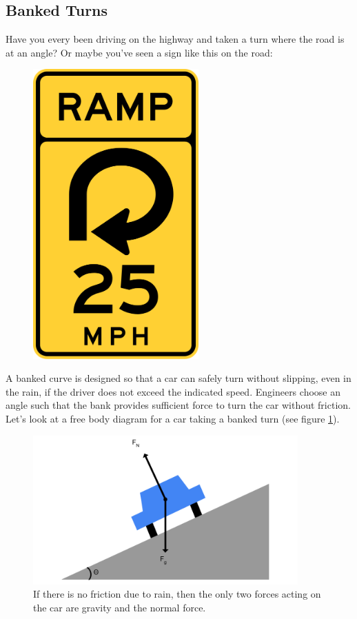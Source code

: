 \subsection{Banked Turns}
Have you every been driving on the highway and taken a turn where the road is at an angle? Or maybe you've seen a sign like this on the road:

\begin{figure} %
\includegraphics[width=2.5in]{traffic.png}
\end{figure}

A banked curve is designed so that a car can safely turn without slipping, even in the rain, if the driver does not exceed the indicated speed. Engineers choose an angle such that the bank provides sufficient force to turn the car without friction. Let's look at a free body diagram for a car taking a banked turn (see figure \ref{fig:banked}). 
\vspace{4cm} %
\begin{figure}[htbp]
    \centering
    \includegraphics[width=4in]{banked.png}
    \caption{If there is no friction due to rain, then the only two forces acting on the car are gravity and the normal force.}
    \label{fig:banked}
\end{figure}

